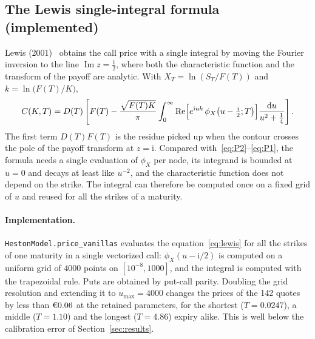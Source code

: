 \documentclass[11pt,a4paper]{article}
\theoremstyle{plain}
\theoremstyle{definition}
\newcommand{\dd}{\mathrm{d}}
\newcommand{\Real}{\operatorname{Re}}
\newcommand{\iu}{\mathrm{i}}
\begin{document}
\subsection{The Lewis single-integral formula (implemented)}
Lewis (2001)~\cite{lewis} obtains the call price with a single integral by moving the Fourier inversion to the line $\operatorname{Im} z=\frac12$, where both the characteristic function and the transform of the payoff are analytic. With $X_T=\ln(S_T/F(T))$ and $k=\ln\bigl(F(T)/K\bigr)$,
\begin{equation}
    C(K,T)=D(T)\left[F(T)-\frac{\sqrt{F(T)K}}{\pi}\int_0^\infty\Real\Bigl[e^{\iu uk}\,\phi_X\bigl(u-\tfrac{\iu}{2};T\bigr)\Bigr]\frac{\dd u}{u^2+\frac14}\right].
    \label{eq:lewis}
\end{equation}
The first term $D(T)F(T)$ is the residue picked up when the contour crosses the pole of the payoff transform at $z=\iu$. Compared with~\eqref{eq:P2}--\eqref{eq:P1}, the formula needs a single evaluation of $\phi_X$ per node, its integrand is bounded at $u=0$ and decays at least like $u^{-2}$, and the characteristic function does not depend on the strike. The integral can therefore be computed once on a fixed grid of $u$ and reused for all the strikes of a maturity.

\paragraph{Implementation.} \texttt{HestonModel.price\_vanillas} evaluates the equation~\eqref{eq:lewis} for all the strikes of one maturity in a single vectorized call: $\phi_X(u-\iu/2)$ is computed on a uniform grid of $4000$ points on $[10^{-8},1000]$, and the integral is computed with the trapezoidal rule. Puts are obtained by put-call parity. Doubling the grid resolution and extending it to $u_{\max}=4000$ changes the prices of the 142 quotes by less than $\text{\texteuro}0.06$ at the retained parameters, for the shortest ($T=0.0247$), a middle ($T=1.10$) and the longest ($T=4.86$) expiry alike. This is well below the calibration error of Section~\ref{sec:results}.
\end{document}
